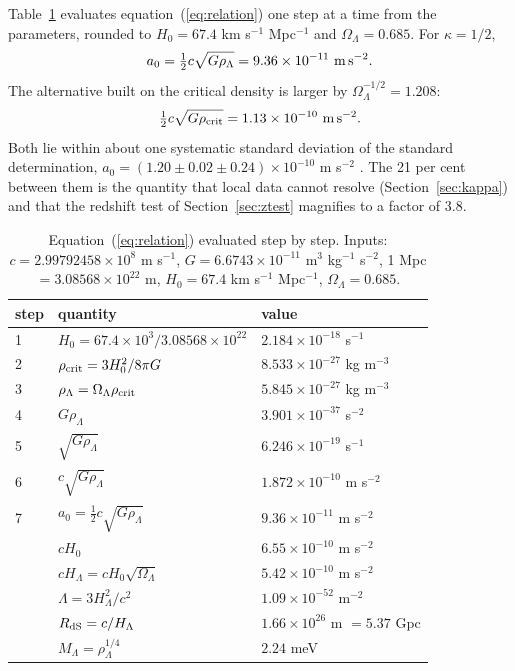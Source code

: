 \documentclass[fleqn,usenatbib]{mnras}
\begin{document}
Table~\ref{tab:inputs} evaluates equation~(\ref{eq:relation}) one step at a time from the \citet{Planck2020} parameters, rounded to $H_0=67.4$ km s$^{-1}$ Mpc$^{-1}$ and $\Omega_\Lambda=0.685$. For $\kappa=1/2$,
\begin{equation}
a_0=\tfrac12c\sqrt{G\rho_\Lambda}=9.36\times10^{-11}\ {\rm m\,s^{-2}} .
\label{eq:a0value}
\end{equation}
The alternative built on the critical density is larger by $\Omega_\Lambda^{-1/2}=1.208$:
\begin{equation}
\tfrac12c\sqrt{G\rho_{\rm crit}}=1.13\times10^{-10}\ {\rm m\,s^{-2}} .
\label{eq:a0crit}
\end{equation}
Both lie within about one systematic standard deviation of the standard determination, $a_0=(1.20\pm0.02\pm0.24)\times10^{-10}$ m s$^{-2}$ \citep{McGaugh2016}. The 21 per cent between them is the quantity that local data cannot resolve (Section~\ref{sec:kappa}) and that the redshift test of Section~\ref{sec:ztest} magnifies to a factor of 3.8.

\begin{table}
\caption{Equation~(\ref{eq:relation}) evaluated step by step. Inputs: $c=2.99792458\times10^{8}$ m s$^{-1}$, $G=6.6743\times10^{-11}$ m$^3$ kg$^{-1}$ s$^{-2}$, 1 Mpc $=3.08568\times10^{22}$ m, $H_0=67.4$ km s$^{-1}$ Mpc$^{-1}$, $\Omega_\Lambda=0.685$.}
\label{tab:inputs}
\begin{tabular}{lll}
\toprule
step & quantity & value\\
\midrule
1 & $H_0=67.4\times10^{3}/3.08568\times10^{22}$ & $2.184\times10^{-18}$ s$^{-1}$\\
2 & $\rho_{\rm crit}=3H_0^2/8\pi G$ & $8.533\times10^{-27}$ kg m$^{-3}$\\
3 & $\rho_\Lambda=\Omega_\Lambda\rho_{\rm crit}$ & $5.845\times10^{-27}$ kg m$^{-3}$\\
4 & $G\rho_\Lambda$ & $3.901\times10^{-37}$ s$^{-2}$\\
5 & $\sqrt{G\rho_\Lambda}$ & $6.246\times10^{-19}$ s$^{-1}$\\
6 & $c\sqrt{G\rho_\Lambda}$ & $1.872\times10^{-10}$ m s$^{-2}$\\
7 & $a_0=\tfrac12c\sqrt{G\rho_\Lambda}$ & $9.36\times10^{-11}$ m s$^{-2}$\\
\midrule
  & $cH_0$ & $6.55\times10^{-10}$ m s$^{-2}$\\
  & $cH_\Lambda=cH_0\sqrt{\Omega_\Lambda}$ & $5.42\times10^{-10}$ m s$^{-2}$\\
  & $\Lambda=3H_\Lambda^2/c^2$ & $1.09\times10^{-52}$ m$^{-2}$\\
  & $R_{\rm dS}=c/H_\Lambda$ & $1.66\times10^{26}$ m $=5.37$ Gpc\\
  & $M_\Lambda=\rho_\Lambda^{1/4}$ & $2.24$ meV\\
\bottomrule
\end{tabular}
\end{table}
\end{document}
